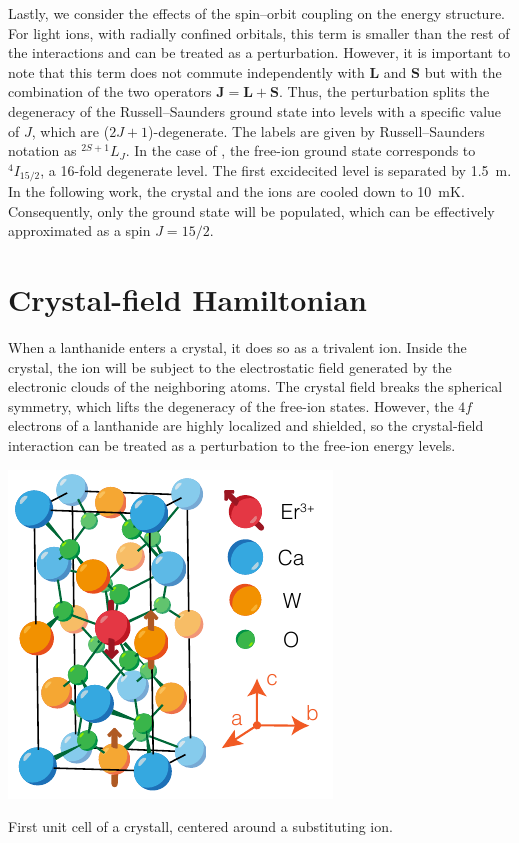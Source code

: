 Lastly, we consider the effects of the spin--orbit coupling on the energy structure. For light ions, with radially confined orbitals, this term is smaller than the rest of the interactions and can be treated as a perturbation. However, it is important to note that this term does not commute independently with $\mathbf{L}$ and $\mathbf{S}$ but with the combination of the two operators $\mathbf{J} = \mathbf{L} + \mathbf{S}$. Thus, the perturbation splits the degeneracy of the Russell--Saunders ground state into levels with a specific value of $J$, which are ($2J+1$)-degenerate. The labels are given by Russell--Saunders notation as $^{2S+1}L_J$. In the case of \Er, the free-ion ground state corresponds to $^4I_{15/2}$, a 16-fold degenerate level. The first excidecited level is separated by 1.5~\textmu m. In the following work, the \Ca crystal and the ions are cooled down to 10~mK. Consequently, only the ground state will be populated, which can be effectively approximated as a spin $J=15/2$.

\section{Crystal-field Hamiltonian}
When a lanthanide enters a crystal, it does so as a trivalent ion. Inside the crystal, the ion will be subject to the electrostatic field generated by the electronic clouds of the neighboring atoms. The crystal field breaks the spherical symmetry, which lifts the degeneracy of the free-ion states. However, the $4f$ electrons of a lanthanide are highly localized and shielded, so the crystal-field interaction can be treated as a perturbation to the free-ion energy levels. 

\begin{marginfigure}
    \includegraphics{chapter2/figures/crystal.pdf}
    \caption[\Ca crystal]{First unit cell of a \Ca crystall, centered around a substituting \Er ion.}
\end{marginfigure}

